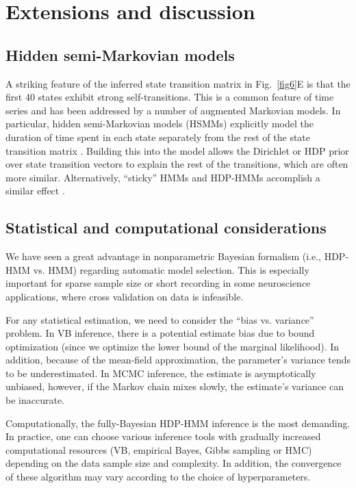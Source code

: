 \section{Extensions and discussion}

\subsection{Hidden semi-Markovian models}
A striking feature of the inferred state transition matrix in
Fig.~\ref{fig6}E is that the first 40 states exhibit strong
self-transitions. This is a common feature of time series and has been
addressed by a number of augmented Markovian models. In particular,
hidden semi-Markovian models (HSMMs) explicitly model the duration of
time spent in each state separately from the rest of the state
transition matrix \citep{Johnson13}. Building this into the model
allows the Dirichlet or HDP prior over state transition vectors to
explain the rest of the transitions, which are often more
similar. Alternatively, ``sticky'' HMMs and HDP-HMMs accomplish a
similar effect \citep{Fox08}.

\subsection{Statistical and computational considerations}
We have seen a great advantage in nonparametric Bayesian formalism
(i.e., HDP-HMM vs. HMM) regarding automatic model selection. This is
especially important for sparse sample size or short recording in some
neuroscience applications, where cross validation on data is
infeasible.

For any statistical estimation, we need to consider the ``bias
vs. variance'' problem.  In VB inference, there is a potential
estimate bias due to bound optimization (since we optimize the lower
bound of the marginal likelihood). In addition, because of the
mean-field approximation, the parameter's variance tends to be
underestimated. In MCMC inference, the estimate is asymptotically
unbiased, however, if the Markov chain mixes slowly, the estimate's
variance can be inaccurate.

Computationally, the fully-Bayesian HDP-HMM inference is the most
demanding. In practice, one can choose various inference tools with
gradually increased computational resources (VB, empirical Bayes,
Gibbs sampling or HMC) depending on the data sample size and
complexity. In addition, the convergence of these algorithm may vary
according to the choice of hyperparameters.


